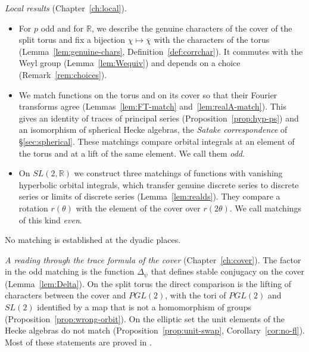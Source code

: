 \documentclass[12pt,letterpaper,openany]{book}
\theoremstyle{plain}
\theoremstyle{definition}
\theoremstyle{remark}
\theoremstyle{remark}
\begin{document}
\emph{Local results} (Chapter~\ref{ch:local}).
\begin{itemize}
\item For $p$ odd and for ${\mathbb R}$, we describe the genuine characters
of the cover of the split torus and fix a bijection
$\chi\mapsto\overline\chi$ with the characters of the torus
(Lemma~\ref{lem:genuine-chars}, Definition~\ref{def:corrchar}). It commutes
with the Weyl group (Lemma~\ref{lem:Wequiv}) and depends on a choice
(Remark~\ref{rem:choices}).
\item We match functions on the torus and on its cover so that their
Fourier transforms agree (Lemmas~\ref{lem:FT-match}
and~\ref{lem:realA-match}). This gives an identity of traces of principal
series (Proposition~\ref{prop:hyp-ps}) and an isomorphism of spherical
Hecke algebras, the \emph{Satake correspondence} of
\S\ref{sec:spherical}. These matchings compare orbital integrals at an
element of the torus and at a lift of the same element. We call them
\emph{odd}.
\item On $SL(2,{\mathbb R})$ we construct three matchings of functions
with vanishing hyperbolic orbital integrals, which transfer genuine
discrete series to discrete series or limits of discrete series
(Lemma~\ref{lem:realds}). They compare a rotation $r(\theta)$ with the
element of the cover over $r(2\theta)$. We call matchings of this kind
\emph{even}.
\end{itemize}
No matching is established at the dyadic places.

\emph{A reading through the trace formula of the cover}
(Chapter~\ref{ch:cover}). The factor in the odd matching is the function
$\Delta_\psi$ that defines stable conjugacy on the cover
(Lemma~\ref{lem:Delta}). On the split torus the direct comparison is the
lifting of characters between the cover and $PGL(2)$, with the tori of
$PGL(2)$ and $SL(2)$ identified by a map that is not a homomorphism of
groups (Proposition~\ref{prop:wrong-orbit}). On the elliptic set the unit
elements of the Hecke algebras do not match
(Proposition~\ref{prop:unit-swap}, Corollary~\ref{cor:no-fl}). Most of
these statements are proved in \cite{JC}.
\end{document}
